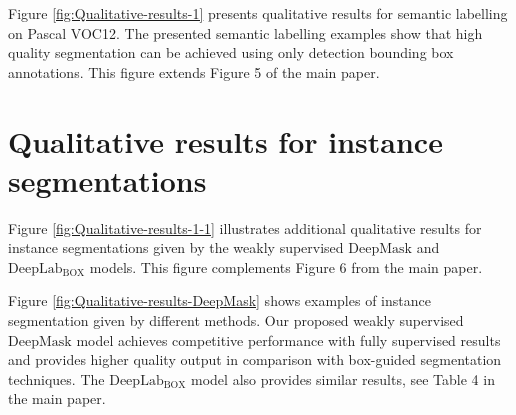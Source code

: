 \documentclass[10pt,english,british,twocolumn]{article}
\begin{document}
Figure \ref{fig:Qualitative-results-1} presents qualitative results
for semantic labelling on Pascal VOC12. The presented semantic labelling
examples show that high quality segmentation can be achieved using
only detection bounding box annotations. This figure extends Figure
5 of the main paper.

\section{\label{sec:Qualitative-results-for-1}Qualitative results for instance
segmentations}

Figure \ref{fig:Qualitative-results-1-1} illustrates additional qualitative
results for instance segmentations given by the weakly supervised
$\mathrm{DeepMask}$ and $\mathrm{DeepLab_{BOX}}$ models. This figure
complements Figure 6 from the main paper.

Figure \ref{fig:Qualitative-results-DeepMask} shows examples of instance
segmentation given by different methods. Our proposed weakly supervised
$\mathrm{DeepMask}$ model achieves competitive performance with fully
supervised results and provides higher quality output in comparison
with box-guided segmentation techniques. The $\mathrm{DeepLab_{BOX}}$
model also provides similar results, see Table 4 in the main paper.
\end{document}
